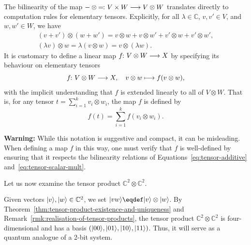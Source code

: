 \documentclass[a4paper, oneside, 12pt]{amsart}
\begin{document}
\begin{remark}\label{rmk:bilinearity-on-the-level-of-elementary-tensors}
  The bilinearity of the  map \( \blank \otimes \bblank \from V\times W \to V\otimes W\) translates directly to computation rules for elementary tensors.
  Explicitly, for all \(\lambda \in \mathbb{C}\), \(v, v' \in V\), and \(w, w' \in W\), we have
  \begin{subequations}
    \begin{gather}
      (v+v')\otimes (w+w') = v\otimes w + v \otimes w' + v' \otimes w + v' \otimes w', \label{eq:tensor-additive}\\
      (\lambda v) \otimes w = \lambda(v\otimes w) = v \otimes (\lambda w).\label{eq:tensor-scalar-mult}
    \end{gather}
  \end{subequations}
  It is customary to define a linear map \( f \from V \otimes W \to X \) by specifying its behaviour on elementary tensors
  \begin{equation*}
    f \from V \otimes W \to X, \quad v \otimes w \mapsto f(v \otimes w),
  \end{equation*}
  with the implicit understanding that \( f \) is extended linearly to all of \( V \otimes W \).
  That is, for any tensor \( t = \sum_{i=1}^k v_i \otimes w_i \), the map \( f \) is defined by
  \begin{equation*}
    f(t) = \sum_{i=1}^k f(v_i \otimes w_i).
  \end{equation*}

  \textbf{Warning:} While this notation is suggestive and compact, it can be misleading.
  When defining a map \( f \) in this way, one must verify that \( f \) is well-defined by ensuring that it respects the bilinearity relations of Equations~\eqref{eq:tensor-additive} and~\eqref{eq:tensor-scalar-mult}.
\end{remark}

Let us now examine the tensor product \( \mathbb{C}^2 \otimes \mathbb{C}^2 \).

\begin{example}\label{ex:c2-otimes-c2}
  Given vectors \(\lvert v\rangle, \lvert w\rangle \in \mathbb{C}^{2}\), we set \(\ket{vw} \eqdef \ket{v} \otimes \ket{w}\).
  By Theorem~\ref{thm:tensor-product-existence-and-uniqueness} and Remark~\ref{rmk:realisation-of-tensor-products}, the tensor product \( \mathbb{C}^2 \otimes \mathbb{C}^2 \) is four-dimensional and has a basis \( (\lvert00\rangle, \lvert01\rangle, \lvert10\rangle, \lvert11\rangle) \).
  Thus, it will serve as a quantum analogue of a 2-bit system.
\end{example}
\end{document}
